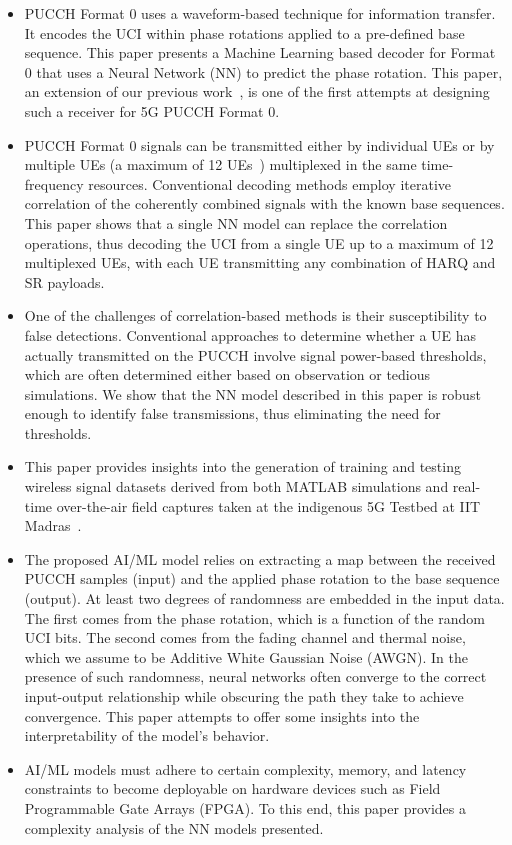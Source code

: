 \documentclass[journal]{IEEEtran}
\begin{document}
\begin{itemize}
    \item PUCCH Format 0 uses a waveform-based technique for information transfer. It encodes the UCI within phase rotations applied to a pre-defined base sequence. This paper presents a Machine Learning based decoder for Format 0 that uses a Neural Network (NN) to predict the phase rotation. This paper, an extension of our previous work~\cite{yerrapragada2023machine}, is one of the first attempts at designing such a receiver for 5G PUCCH Format 0. 
    \item PUCCH Format 0 signals can be transmitted either by individual UEs or by multiple UEs (a maximum of 12 UEs~\cite{3gpp_38_211}) multiplexed in the same time-frequency resources. Conventional decoding methods employ iterative correlation of the coherently combined signals with the known base sequences. This paper shows that a single NN model can replace the correlation operations, thus decoding the UCI from a single UE up to a maximum of 12 multiplexed UEs, with each UE transmitting any combination of HARQ and SR payloads.
    \item One of the challenges of correlation-based methods is their susceptibility to false detections. Conventional approaches to determine whether a UE has actually transmitted on the PUCCH involve signal power-based thresholds, which are often determined either based on observation or tedious simulations. We show that the NN model described in this paper is robust enough to identify false transmissions, thus eliminating the need for thresholds.
    \item This paper provides insights into the generation of training and testing wireless signal datasets derived from both MATLAB simulations and real-time over-the-air field captures taken at the indigenous 5G Testbed at IIT Madras~\cite{5gtbiitm}. 
    \item The proposed AI/ML model relies on extracting a map between the received PUCCH samples (input) and the applied phase rotation to the base sequence (output). At least two degrees of randomness are embedded in the input data. The first comes from the phase rotation, which is a function of the random UCI bits. The second comes from the fading channel and thermal noise, which we assume to be Additive White Gaussian Noise (AWGN). In the presence of such randomness, neural networks often converge to the correct input-output relationship while obscuring the path they take to achieve convergence. This paper attempts to offer some insights into the interpretability of the model's behavior.
    \item AI/ML models must adhere to certain complexity, memory, and latency constraints to become deployable on hardware devices such as Field Programmable Gate Arrays (FPGA). To this end, this paper provides a complexity analysis of the NN models presented. 
\end{itemize}
\end{document}
